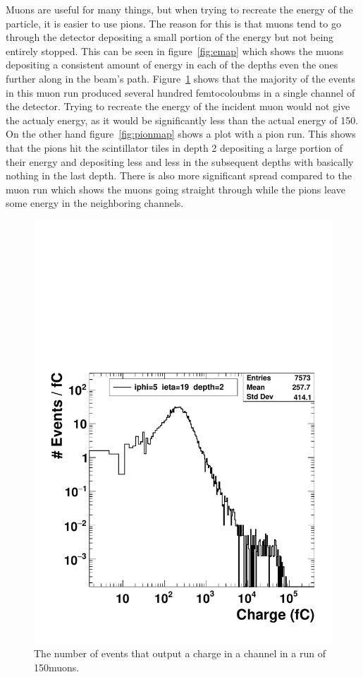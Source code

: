 Muons are useful for many things, but when trying to recreate the energy of the particle, it is easier to use pions. The reason for this is that muons tend to go through the detector depositing a small portion of the energy but not being entirely stopped. This can be seen in figure~\ref{fig:emap} which shows the muons depositing a consistent amount of energy in each of the depths even the ones further along in the beam's path. Figure~\ref{fig:Muon} shows that the majority of the events in this muon run produced several hundred femtocoloubms in a single channel of the detector. Trying to recreate the energy of the incident muon would not give the actualy energy, as it would be significantly less than the actual energy of 150\GeV. On the other hand figure~\ref{fig:pionmap} shows a plot with a pion run. This shows that the pions hit the scintillator tiles in depth 2 depositing a large portion of their energy and depositing less and less in the subsequent depths with basically nothing in the last depth. There is also more significant spread compared to the muon run which shows the muons going straight through while the pions leave some energy in the neighboring channels.

\begin{figure}
\centering
\includegraphics[width=0.7\linewidth]{Figures/MuonCharge.pdf}
\caption{The number of events that output a charge in a channel in a run of 150\GeV\space muons.}
\label{fig:Muon}
\end{figure}

